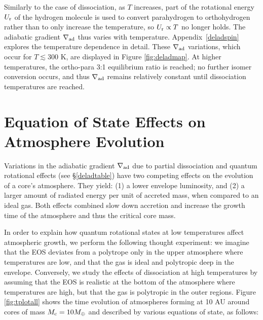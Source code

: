 \documentclass[apj]{emulateapj}
\newcommand{\delad}{\nabla_{\rm ad}}
\newcommand{\App}[1]{Appendix~\ref{#1}}
\newcommand{\co}{_{\rm c}}
\begin{document}

Similarly to the case of dissociation, as $T$ increases, part of the rotational energy $U_{\rm r}$ of the hydrogen molecule is used to convert parahydrogen to orthohydrogen rather than to only increase the temperature, so $U_{\rm r} \propto T$ no longer holds. The adiabatic gradient $\delad$ thus varies with temperature. \App{deladspin} explores the temperature dependence in detail. These $\delad$ variations, which occur for $T \lesssim 300$ K, are displayed in Figure \ref{fig:deladmap}. At higher temperatures, the ortho-para 3:1 equilibrium ratio is reached; no further isomer conversion occurs, and thus $\delad$ remains relatively constant until dissociation temperatures are reached. 



\section{Equation of State Effects on Atmosphere Evolution}
\label{EOSeffects}

Variations in the adiabatic gradient $\delad$ due to partial dissociation and quantum rotational effects (see \S\ref{deladtable}) have two competing effects on the evolution of a core's atmosphere. They yield: (1) a lower envelope luminosity, and (2) a larger amount of radiated energy per unit of accreted mass, when compared to an ideal gas. Both effects combined slow down accretion and increase the growth time of the atmosphere and thus the critical core mass.  

In order to explain how quantum rotational states at low temperatures affect atmospheric growth, we perform the following thought experiment: we imagine that the EOS deviates from a polytrope only in the upper atmosphere where temperatures are low, and that the gas is ideal and polytropic deep in the envelope. Conversely, we study the effects of dissociation at high temperatures by assuming that the EOS is realistic at the bottom of the atmosphere where temperatures are high, but that the gas is polytropic in the outer regions. Figure \ref{fig:tplotall} shows the time evolution of atmospheres forming at 10 AU around cores of mass $M\co=10 M_{\oplus}$ and described by various equations of state, as follows:
\end{document}
